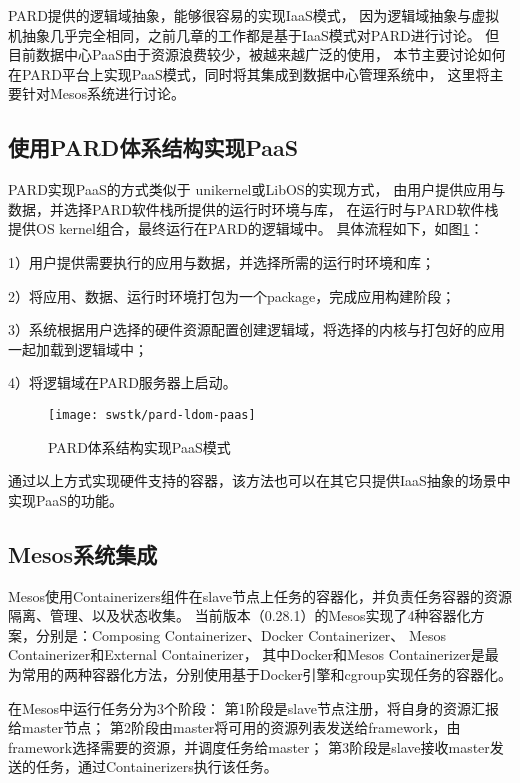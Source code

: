 PARD提供的逻辑域抽象，能够很容易的实现IaaS模式，
因为逻辑域抽象与虚拟机抽象几乎完全相同，之前几章的工作都是基于IaaS模式对PARD进行讨论。
但目前数据中心PaaS由于资源浪费较少，被越来越广泛的使用，
本节主要讨论如何在PARD平台上实现PaaS模式，同时将其集成到数据中心管理系统中，
这里将主要针对Mesos系统进行讨论。

\subsection{使用PARD体系结构实现PaaS}
PARD实现PaaS的方式类似于
unikernel\cite{Unikernels:2013}或LibOS\cite{Porter:2011}的实现方式，
由用户提供应用与数据，并选择PARD软件栈所提供的运行时环境与库，
在运行时与PARD软件栈提供OS kernel组合，最终运行在PARD的逻辑域中。
具体流程如下，如图\ref{fig:pard-ldom-paas}：

1）用户提供需要执行的应用与数据，并选择所需的运行时环境和库；

2）将应用、数据、运行时环境打包为一个package，完成应用构建阶段；

3）系统根据用户选择的硬件资源配置创建逻辑域，将选择的内核与打包好的应用一起加载到逻辑域中；

4）将逻辑域在PARD服务器上启动。

\begin{figure}[tb]
  \centering
  \texttt{[image: swstk/pard-ldom-paas]}
  \caption{PARD体系结构实现PaaS模式}
  \label{fig:pard-ldom-paas}
\end{figure}

通过以上方式实现硬件支持的容器，该方法也可以在其它只提供IaaS抽象的场景中实现PaaS的功能。

\subsection{Mesos系统集成}

Mesos使用Containerizers组件在slave节点上任务的容器化，并负责任务容器的资源隔离、管理、以及状态收集。
当前版本（0.28.1）的Mesos实现了4种容器化方案，分别是：Composing Containerizer、Docker Containerizer、
Mesos Containerizer和External Containerizer，
其中Docker和Mesos Containerizer是最为常用的两种容器化方法，分别使用基于Docker引擎和cgroup实现任务的容器化。

在Mesos中运行任务分为3个阶段：
第1阶段是slave节点注册，将自身的资源汇报给master节点；
第2阶段由master将可用的资源列表发送给framework，由framework选择需要的资源，并调度任务给master；
第3阶段是slave接收master发送的任务，通过Containerizers执行该任务。

